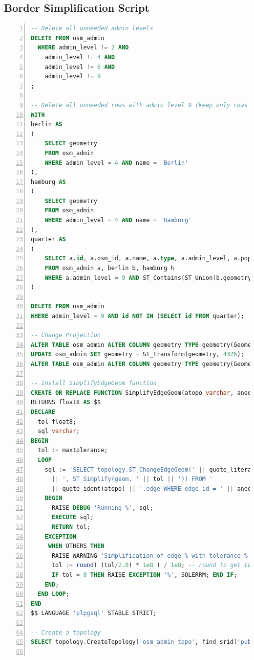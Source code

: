 \documentclass[paper=a4, fontsize=11pt]{article} %
\numberwithin{equation}{section} %
\numberwithin{figure}{section} %
\numberwithin{table}{section} %
\begin{document}
\subsection{Border Simplification Script}{\label{simplifycation_script}

\begin{lstlisting}[language=sql,numbers=left]
-- Delete all unneeded admin levels
DELETE FROM osm_admin
  WHERE admin_level != 2 AND
    admin_level != 4 AND
    admin_level != 6 AND
    admin_level != 9
;

-- Delete all unneeded rows with admin level 9 (keep only rows of admin level 9 contained in the states hamburg and berlin)
WITH
berlin AS
(
    SELECT geometry
    FROM osm_admin
    WHERE admin_level = 4 AND name = 'Berlin'
),
hamburg AS
(
    SELECT geometry
    FROM osm_admin
    WHERE admin_level = 4 AND name = 'Hamburg'
),
quarter AS
(
    SELECT a.id, a.osm_id, a.name, a.type, a.admin_level, a.population, a.geometry
    FROM osm_admin a, berlin b, hamburg h
    WHERE a.admin_level = 9 AND ST_Contains(ST_Union(b.geometry, h.geometry), a.geometry)
)

DELETE FROM osm_admin
WHERE admin_level = 9 AND id NOT IN (SELECT id FROM quarter);

-- Change Projection
ALTER TABLE osm_admin ALTER COLUMN geometry TYPE geometry(Geometry);
UPDATE osm_admin SET geometry = ST_Transform(geometry, 4326);
ALTER TABLE osm_admin ALTER COLUMN geometry TYPE geometry(Geometry, 4326);

-- Install SimplifyEdgeGeom function
CREATE OR REPLACE FUNCTION SimplifyEdgeGeom(atopo varchar, anedge int, maxtolerance float8)
RETURNS float8 AS $$
DECLARE
  tol float8;
  sql varchar;
BEGIN
  tol := maxtolerance;
  LOOP
    sql := 'SELECT topology.ST_ChangeEdgeGeom(' || quote_literal(atopo) || ', ' || anedge
      || ', ST_Simplify(geom, ' || tol || ')) FROM '
      || quote_ident(atopo) || '.edge WHERE edge_id = ' || anedge;
    BEGIN
      RAISE DEBUG 'Running %', sql;
      EXECUTE sql;
      RETURN tol;
    EXCEPTION
     WHEN OTHERS THEN
      RAISE WARNING 'Simplification of edge % with tolerance % failed: %', anedge, tol, SQLERRM;
      tol := round( (tol/2.0) * 1e8 ) / 1e8; -- round to get to zero quicker
      IF tol = 0 THEN RAISE EXCEPTION '%', SQLERRM; END IF;
    END;
  END LOOP;
END
$$ LANGUAGE 'plpgsql' STABLE STRICT;

-- Create a topology
SELECT topology.CreateTopology('osm_admin_topo', find_srid('public', 'osm_admin', 'geometry'));


\end{lstlisting}}
\end{document}
